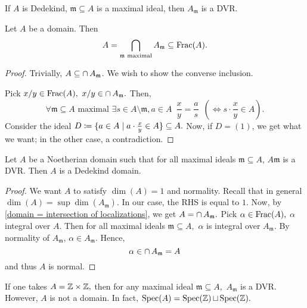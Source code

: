 \begin{corollary}
  If \(A\) is Dedekind, \(\mathfrak m \subseteq A\) is a maximal ideal, then \(A_{\mathfrak m}\) is a DVR.
\end{corollary}

\begin{lemma}
  \label{domain = intersection of localizations}
  Let \(A\) be a domain. Then
  \[A = \operatorname*{\bigcap}_{\mathfrak m \text{ maximal}} A_{\mathfrak m} \subseteq \mathrm{Frac}(A).\]
\end{lemma}
\begin{proof}
  Trivially, \(A \subseteq \operatorname{\cap} A_{\mathfrak m}\). We wish to show the converse inclusion.

  Pick \(x / {y} \in \mathrm{Frac}(A),\) \(x/{y} \in \operatorname{\cap} A_{\mathfrak m}.\)
  Then,
  \[\forall \mathfrak m \subseteq A \text{ maximal } \exists s \in A \setminus \mathfrak m, a \in A \enspace \frac{x}{y} = \frac{a}{s} \enspace (\iff s \cdot \frac{x}{y} \in A).\]
  Consider the ideal
  \(D \coloneqq \{a \in A \mathrel{|} a \cdot \frac{x}{y} \in A\} \subseteq A.\)
  Now, if \(D = (1)\), we get what we want; in the other case, a contradiction.
\end{proof}

\begin{prop}
  Let \(A\) be a Noetherian domain such that for all maximal ideals \(\mathfrak m \subseteq A\), \(A \mathfrak m\) is a DVR.
  Then \(A\) is a Dedekind domain.
\end{prop}
\begin{proof}
  We want \(A\) to satisfy \(\dim(A) = 1\) and normality.
  Recall that in general
  \(\dim(A) = \sup \dim(A_{\mathfrak m}).\)
  In our case, the RHS is equal to \(1.\)
  Now, by \cref{domain = intersection of localizations}, we get \(A = \operatorname{\cap} A_{\mathfrak m}.\)
  Pick \(\alpha \in \mathrm{Frac}(A),\) \(\alpha\) integral over \(A.\)
  Then for all maximal ideals \(\mathfrak m \subseteq A,\) \(\alpha\) is integral over \(A_{\mathfrak m}\). By normality of \(A_{\mathfrak m}\), \(\alpha \in A_{\mathfrak m}.\)
  Hence,
  \[\alpha \in \operatorname{\cap} A_{\mathfrak m} = A\]
  and thus \(A\) is normal.
\end{proof}

\begin{example}
  If one takes \(A = \mathbb Z \times \mathbb Z,\) then for any maximal ideal \(\mathfrak m \subseteq A,\) \(A_{\mathfrak m}\) is a DVR. However, \(A\) is not a domain.
  In fact, \(\text{Spec}(A) = \text{Spec}(\mathbb Z) \operatorname{\sqcup} \text{Spec}(\mathbb Z).\)
\end{example}


